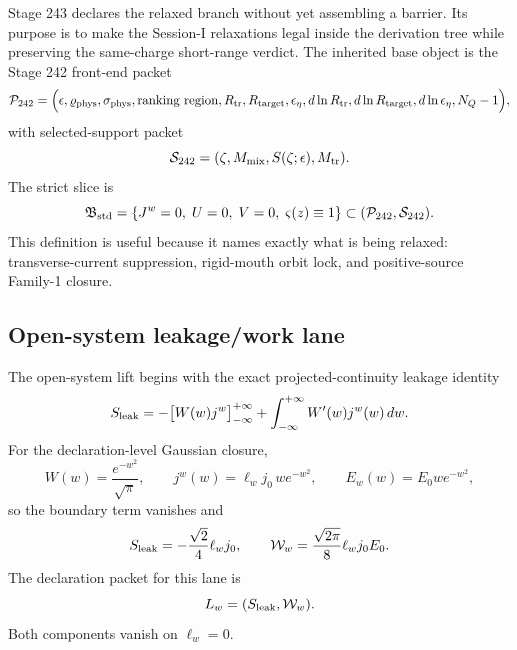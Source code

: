 Stage 243 declares the relaxed branch without yet assembling a barrier.  Its purpose is to make the Session-I relaxations legal inside the derivation tree while preserving the same-charge short-range verdict.  The inherited base object is the Stage 242 front-end packet
\begin{equation}
\label{eq:part08-p225-packet}
\mathcal P_{242}
=
\Bigl(
\epsilon,
\varrho_{\rm phys},
\sigma_{\rm phys},
\text{ranking region},
R_{\rm tr},
R_{\rm target},
\epsilon_\eta,
 d\ln R_{\rm tr},
 d\ln R_{\rm target},
 d\ln\epsilon_\eta,
 N_Q-1
\Bigr),
\end{equation}
with selected-support packet
\begin{equation}
\label{eq:part08-s225-packet}
\mathcal S_{242}=(\zeta,M_{\rm mix},S(\zeta;\epsilon),M_{\rm tr}).
\end{equation}
The strict slice is
\begin{equation}
\label{eq:part08-std-branch-slice}
\mathfrak B_{\rm std}
=
\left\{
J^w=0,
\;U=0,
\;V=0,
\;\varsigma(z)\equiv 1
\right\}
\subset(\mathcal P_{242},\mathcal S_{242}).
\end{equation}
This definition is useful because it names exactly what is being relaxed: transverse-current suppression, rigid-mouth orbit lock, and positive-source Family-1 closure.

\subsection{Open-system leakage/work lane}
\label{subsec:part08-open-lane}

The open-system lift begins with the exact projected-continuity leakage identity
\begin{equation}
\label{eq:part08-stage243-leakage-identity}
S_{\rm leak}
=
-\bigl[W(w)j^w\bigr]_{-\infty}^{+\infty}
+
\int_{-\infty}^{+\infty}W'(w)j^w(w)\,dw.
\end{equation}
For the declaration-level Gaussian closure,
\begin{equation}
\label{eq:part08-stage243-gaussian-profile}
W(w)=\frac{e^{-w^2}}{\sqrt\pi},
\qquad
j^w(w)=\ell_w j_0\,w e^{-w^2},
\qquad
E_w(w)=E_0we^{-w^2},
\end{equation}
so the boundary term vanishes and
\begin{equation}
\label{eq:part08-stage243-leak-work}
S_{\rm leak}=-\frac{\sqrt2}{4}\ell_wj_0,
\qquad
\mathcal W_w=\frac{\sqrt{2\pi}}{8}\ell_wj_0E_0.
\end{equation}
The declaration packet for this lane is
\begin{equation}
\label{eq:part08-stage243-lw}
L_w=(S_{\rm leak},\mathcal W_w).
\end{equation}
Both components vanish on \(\ell_w=0\).

